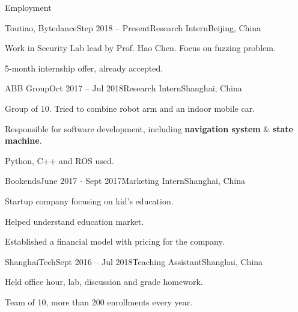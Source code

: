 \documentclass{resume} %
\begin{document}
\begin{rSection}{Employment}

\begin{rSubsection}
  {Toutiao, Bytedance}{Step 2018 – Present}{Research Intern}{Beijing, China}
    \item Work in Security Lab lead by Prof. Hao Chen. Focus on fuzzing problem.
    \item 5-month internship offer, already accepted.
\end{rSubsection}


\begin{rSubsection}
  {ABB Group}{Oct 2017 – Jul 2018}{Research Intern}{Shanghai, China}
    \item Group of 10. Tried to combine robot arm and an indoor mobile car.
    \item Responsible for software development, including \textbf{navigation system} \& \textbf{state machine}.
    \item Python, C++ and ROS used.
\end{rSubsection}


\begin{rSubsection}
  {Bookends}{June 2017 - Sept 2017}{Marketing Intern}{Shanghai, China}
    \item Startup company focusing on kid's education.
    \item Helped understand education market.
    \item Established a financial model with pricing for the company.
\end{rSubsection}


\begin{rSubsection}
  {ShanghaiTech}{Sept 2016 – Jul 2018}{Teaching Assistant}{Shanghai, China}
    \item Held office hour, lab, discussion and grade homework.
    \item Team of 10, more than 200 enrollments every year.
\end{rSubsection}

\end{rSection}
\end{document}
